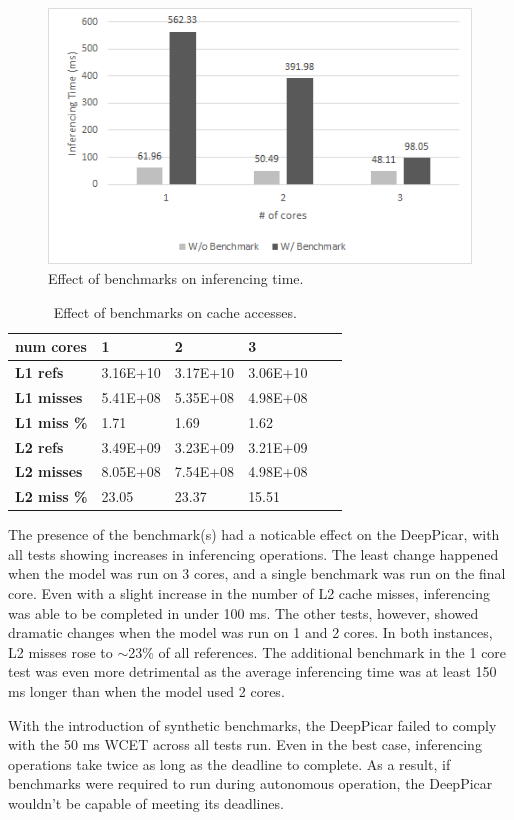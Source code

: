 \begin{figure}[h]
  \centering
  \includegraphics[width=.5\textwidth]{figs/BenchmarkChart}
  \caption{ Effect of benchmarks on inferencing time. }
\end{figure}

\begin{table}[h]
\centering
  \begin{tabular} {| l | l | l | l | l | l |}
  \hline
  \textbf{num cores} & 1 & 2 & 3 \\ \hline
  \textbf{L1 refs} & 3.16E+10 & 3.17E+10 & 3.06E+10 \\ \hline
  \textbf{L1 misses} & 5.41E+08 & 5.35E+08 & 4.98E+08 \\ \hline
  \textbf{L1 miss \%} & 1.71 & 1.69 & 1.62 \\ \hline
  \textbf{L2 refs} & 3.49E+09 & 3.23E+09 & 3.21E+09 \\ \hline
  \textbf{L2 misses} & 8.05E+08 & 7.54E+08 & 4.98E+08 \\ \hline
  \textbf{L2 miss \%} & 23.05 & 23.37 & 15.51 \\ 
  \hline
  \end{tabular}
  \caption{ Effect of benchmarks on cache accesses. }
\end{table}

The presence of the benchmark(s) had a noticable effect on the DeepPicar, with all tests showing 
increases in inferencing operations. The least change happened when the model was run on 3 cores, and a 
single benchmark was run on the final core. Even with a slight increase in the number of L2 cache 
misses, inferencing was able to be completed in under 100 ms. The other tests, however, showed dramatic 
changes when the model was run on 1 and 2 cores. In both instances, L2 misses rose to $\sim$23\% of all 
references. The additional benchmark in the 1 core test was even more detrimental as the average 
inferencing time was at least 150 ms longer than when the model used 2 cores. 

With the introduction of synthetic benchmarks, the DeepPicar failed to comply with the 50 ms WCET across 
all tests run. Even in the best case, inferencing operations take twice as long as the deadline to 
complete. As a result, if benchmarks were required to run during autonomous operation, the DeepPicar 
wouldn't be capable of meeting its deadlines.

